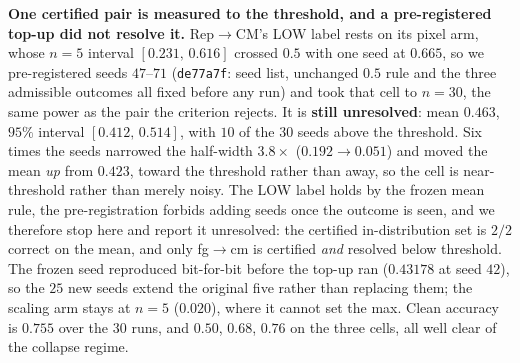\documentclass{article}
\begin{document}
\textbf{One certified pair is measured to the threshold, and a pre-registered top-up did not resolve it.} Rep$\to$CM's LOW label rests on its pixel arm, whose $n{=}5$ interval $[0.231,\,0.616]$ crossed $0.5$ with one seed at $0.665$, so we pre-registered seeds $47$--$71$ (\texttt{de77a7f}: seed list, unchanged $0.5$ rule and the three admissible outcomes all fixed before any run) and took that cell to $n{=}30$, the same power as the pair the criterion rejects. It is \textbf{still unresolved}: mean $0.463$, $95\%$ interval $[0.412,\,0.514]$, with $10$ of the $30$ seeds above the threshold. Six times the seeds narrowed the half-width $3.8\times$ ($0.192 \to 0.051$) and moved the mean \emph{up} from $0.423$, toward the threshold rather than away, so the cell is near-threshold rather than merely noisy. The LOW label holds by the frozen mean rule, the pre-registration forbids adding seeds once the outcome is seen, and we therefore stop here and report it unresolved: the certified in-distribution set is $2/2$ correct on the mean, and only fg$\to$cm is certified \emph{and} resolved below threshold. The frozen seed reproduced bit-for-bit before the top-up ran ($0.43178$ at seed $42$), so the $25$ new seeds extend the original five rather than replacing them; the scaling arm stays at $n{=}5$ ($0.020$), where it cannot set the max. Clean accuracy is $0.755$ over the $30$ runs, and $0.50$, $0.68$, $0.76$ on the three cells, all well clear of the collapse regime.
\end{document}
